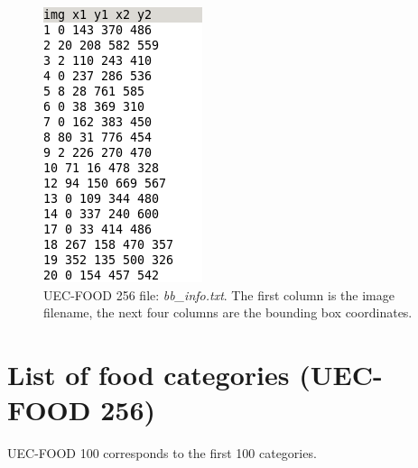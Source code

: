 \begin{itemize}
    \begin{figure}[h]
        \centering
        \includegraphics[scale=0.5]{img/uec_file_bb_info.png}
        \caption[UEC-FOOD 256 file: \textit{bb\_info.txt}]{UEC-FOOD 256 file: \textit{bb\_info.txt}. The first column is the image filename, the next four columns are the bounding box coordinates.}
        \label{fig:uec_file_bb_info}
    \end{figure}
\end{itemize}

\clearpage

\section{List of food categories (UEC-FOOD 256)}

UEC-FOOD 100 corresponds to the first 100 categories.

